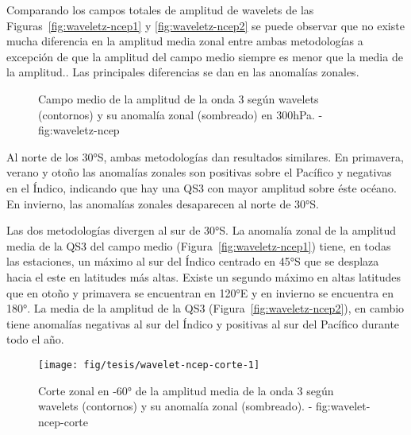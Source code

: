 \documentclass[spanish,a4paper]{book}
\begin{document}
Comparando los campos totales de amplitud de wavelets de las
Figuras~\ref{fig:waveletz-ncep1} y \ref{fig:waveletz-ncep2} se puede
observar que no existe mucha diferencia en la amplitud media zonal entre
ambas metodologías a excepción de que la amplitud del campo medio
siempre es menor que la media de la
amplitud..
Las principales diferencias se dan en las anomalías zonales.

\begin{landscape}\begin{figure}

{\centering {}\newline{}

}

\caption{Campo medio de la amplitud de la onda 3 según wavelets (contornos) y su anomalía zonal (sombreado) en 300hPa. - fig:waveletz-ncep}\label{fig:waveletz-ncep}
\end{figure}
\end{landscape}

Al norte de los 30°S, ambas metodologías dan resultados similares. En
primavera, verano y otoño las anomalías zonales son positivas sobre el
Pacífico y negativas en el Índico, indicando que hay una QS3 con mayor
amplitud sobre éste océano. En invierno, las anomalías zonales
desaparecen al norte de 30°S.

Las dos metodologías divergen al sur de 30°S. La anomalía zonal de la
amplitud media de la QS3 del campo medio
(Figura~\ref{fig:waveletz-ncep1}) tiene, en todas las estaciones, un
máximo al sur del Índico centrado en 45°S que se desplaza hacia el este
en latitudes más altas. Existe un segundo máximo en altas latitudes que
en otoño y primavera se encuentran en 120°E y en invierno se encuentra
en 180°. La media de la amplitud de la QS3
(Figura~\ref{fig:waveletz-ncep2}), en cambio tiene anomalías negativas
al sur del Índico y positivas al sur del Pacífico durante todo el año.


\begin{landscape}\begin{figure}

{\centering \texttt{[image: fig/tesis/wavelet-ncep-corte-1]} 

}

\caption{Corte zonal en -60° de la amplitud media de la onda 3 según wavelets (contornos) y su anomalía zonal (sombreado). - fig:wavelet-ncep-corte}\label{fig:wavelet-ncep-corte}
\end{figure}
\end{landscape}
\end{document}
